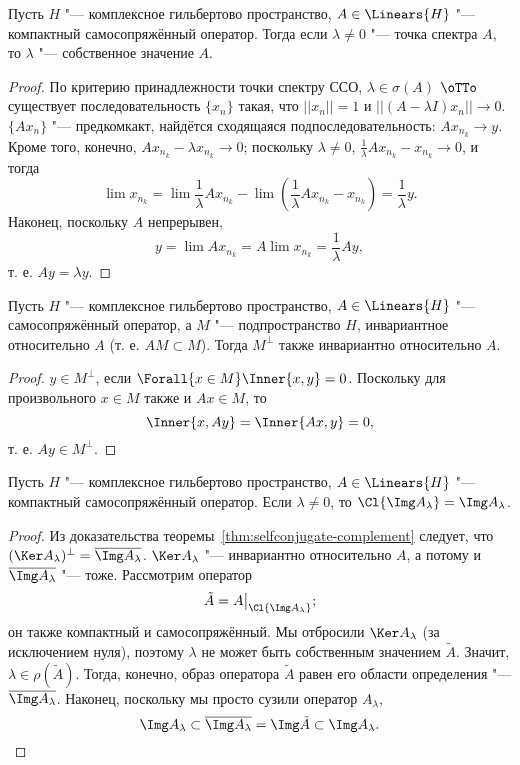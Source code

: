 \documentclass[main]{subfiles}
\begin{document}
\begin{lemma}
  Пусть \( H \) "--- комплексное гильбертово пространство,
  \( A \in \Linears{H} \) "--- компактный самосопряжённый оператор.
  Тогда если \( \lambda \ne 0 \) "--- точка спектра \( A \),
  то \( \lambda \) "--- собственное значение \( A \).
\end{lemma}
\begin{proof}
  По критерию принадлежности точки спектру ССО,
  \( \lambda \in \sigma(A) \) \(\oTTo\) 
  существует последовательность \( \{ x_n \} \)
  такая, что \( ||x_n|| = 1 \) и
  \( ||(A - \lambda I) x_n|| \to 0 \).
  \( \{ A x_n \} \) "--- предкомкакт,
  найдётся сходящаяся подпоследовательность:
  \( A x_{n_k} \to y \).
  Кроме того, конечно,
  \( A x_{n_k} - \lambda x_{n_k} \to 0 \);
  поскольку \( \lambda \ne 0 \),
  \( \frac1\lambda A x_{n_k} - x_{n_k} \to 0 \),
  и тогда
  \[
    \lim x_{n_k} = \lim \frac1\lambda A x_{n_k} - \lim (\frac1\lambda A x_{n_k} - x_{n_k}) =
    \frac1\lambda y.
  \]
  Наконец, поскольку \( A \) непрерывен,
  \[
    y = \lim A x_{n_k} = A \lim x_{n_k} = \frac1\lambda A y,
  \]
  т. е. \( A y = \lambda y \).
\end{proof}

\begin{lemma}%
  Пусть \( H \) "--- комплексное гильбертово пространство,
  \( A \in \Linears{H} \) "--- самосопряжённый оператор,
  а \( M \) "--- подпространство \( H \),
  инвариантное относительно \( A \)
  (т. е. \( AM \subset M \)).
  Тогда \( M^\perp \) также инвариантно
  относительно \( A \).
\end{lemma}
\begin{proof}
  \( y \in M^\perp \), если \( \Forall{x \in M}
  \Inner{x, y} = 0 \).
  Поскольку для произвольного \( x \in M \)
  также и \( Ax \in M \), то
  \[
    \Inner{x, Ay} = \Inner{Ax, y} = 0,
  \]
  т. е. \( Ay \in M^\perp \).
\end{proof}

\begin{lemma}%
  Пусть \( H \) "--- комплексное гильбертово пространство,
  \( A \in \Linears{H} \) "--- компактный самосопряжённый оператор.
  Если \( \lambda \ne 0 \),
  то \( \Cl{\Img A_\lambda} = \Img A_\lambda \).
\end{lemma}
\begin{proof}
  Из доказательства теоремы~\ref{thm:selfconjugate-complement}
  следует, что \( (\Ker A_\lambda)^\perp = \overline{\Img A_\lambda} \).
  \( \Ker A_\lambda \) "--- инвариантно относительно \( A \),
  а потому и \( \overline{\Img A_\lambda} \) "--- тоже.
  Рассмотрим оператор
  \[ \tilde A = A \bigr|_{\Cl{\Img A_\lambda}};\]
  он также компактный и самосопряжённый.
  Мы отбросили
  \( \Ker A_\lambda \) (за исключением нуля),
  поэтому  \( \lambda \)
  не может быть собственным значением \( \tilde A \).
  Значит, \( \lambda \in \rho(\tilde A) \).
  Тогда, конечно, образ оператора \( \tilde A \) равен
  его области определения "--- \( \overline{\Img A_\lambda} \).
  Наконец, поскольку мы просто сузили оператор \( A_\lambda \),
  \[
    \Img A_\lambda \subset
    \overline{\Img A_\lambda} =
    \Img \tilde A \subset
    \Img A_\lambda. \qedhere
  \]
\end{proof}
\end{document}

